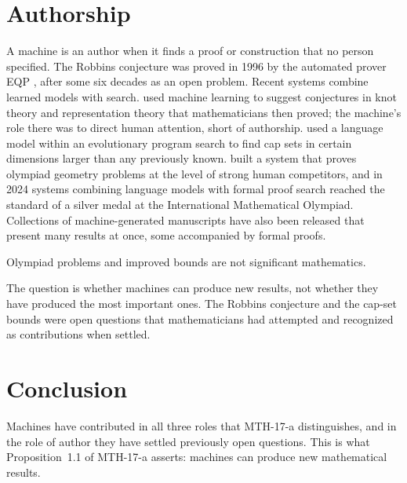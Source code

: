 \documentclass{situationist-preprint}
\begin{document}
\section{Authorship}

A machine is an author when it finds a proof or construction that no person specified. The Robbins conjecture was proved in 1996 by the automated prover EQP \citep{McCune1997}, after some six decades as an open problem. Recent systems combine learned models with search. \citet{DaviesEtAl2021} used machine learning to suggest conjectures in knot theory and representation theory that mathematicians then proved; the machine's role there was to direct human attention, short of authorship. \citet{RomeraParedesEtAl2024} used a language model within an evolutionary program search to find cap sets in certain dimensions larger than any previously known. \citet{TrinhEtAl2024} built a system that proves olympiad geometry problems at the level of strong human competitors, and in 2024 systems combining language models with formal proof search reached the standard of a silver medal at the International Mathematical Olympiad. Collections of machine-generated manuscripts have also been released that present many results at once, some accompanied by formal proofs.

\begin{objection}
Olympiad problems and improved bounds are not significant mathematics.
\end{objection}

\begin{reply}
The question is whether machines can produce new results, not whether they have produced the most important ones. The Robbins conjecture and the cap-set bounds were open questions that mathematicians had attempted and recognized as contributions when settled.
\end{reply}

\section{Conclusion}

Machines have contributed in all three roles that MTH-17-a distinguishes, and in the role of author they have settled previously open questions. This is what Proposition~1.1 of MTH-17-a asserts: machines can produce new mathematical results.
\end{document}
